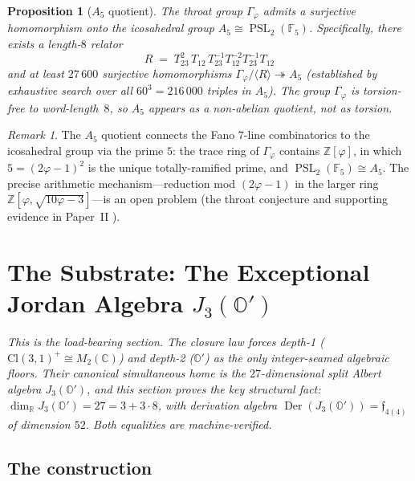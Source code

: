 \documentclass[11pt,a4paper]{article}
\theoremstyle{plain}
\newtheorem{proposition}[theorem]{Proposition}
\theoremstyle{definition}
\theoremstyle{remark}
\newtheorem{remark}[theorem]{Remark}
\numberwithin{equation}{section}
\providecommand{\Cl}{\mathrm{Cl}}
\providecommand{\R}{\mathbb{R}}
\providecommand{\C}{\mathbb{C}}
\providecommand{\Z}{\mathbb{Z}}
\providecommand{\F}{\mathbb{F}}
\providecommand{\Os}{\mathbb{O}'}
\providecommand{\vp}{\varphi}
\providecommand{\fk}[1]{\mathfrak{#1}}
\DeclareMathOperator{\Der}{Der}
\providecommand{\PSL}{\operatorname{PSL}}
\newenvironment{sectionopener}
  {\begin{sectionopenerframe}\small\itshape\ignorespaces}
  {\end{sectionopenerframe}}
\begin{document}
\begin{proposition}[$A_5$ quotient]
\label{prop:a5-quotient}
The throat group $\Gamma_\vp$ admits a surjective homomorphism
onto the icosahedral group $A_5 \cong \PSL_2(\F_5)$.
Specifically, there exists a length-$8$ relator
\[
  R \;=\; T_{23}^2 \, T_{12} \, T_{23}^{-1} T_{12}^{-2} T_{23}^{-1} T_{12}
\]
and at least $27\,600$ surjective homomorphisms
$\Gamma_\vp/\langle R\rangle \twoheadrightarrow A_5$
(established by exhaustive search over all $60^3 = 216\,000$
triples in $A_5$).  The group $\Gamma_\vp$ is torsion-free to
word-length~$8$, so $A_5$ appears as a non-abelian quotient, not
as torsion.
\end{proposition}

\begin{remark}
The $A_5$ quotient connects the Fano $7$-line combinatorics to the
icosahedral group via the prime $5$: the trace ring of $\Gamma_\vp$
contains $\Z[\vp]$, in which $5 = (2\vp-1)^2$ is the unique
totally-ramified prime, and $\PSL_2(\F_5) \cong A_5$.
The precise arithmetic mechanism---reduction mod $(2\vp-1)$ in
the larger ring $\Z[\vp, \sqrt{10\vp-3}]$---is an open problem
(the throat conjecture and supporting evidence in
Paper~II \cite{echo-rh}).
\end{remark}

\section{The Substrate: The Exceptional Jordan Algebra \texorpdfstring{$J_3(\Os)$}{J3(O')}}
\label{sec:albert}

\begin{sectionopener}
This is the load-bearing section.  The closure law forces depth-1
($\Cl(3,1)^+ \cong M_2(\C)$) and depth-2 ($\Os$) as the only
integer-seamed algebraic floors.  Their canonical simultaneous
home is the $27$-dimensional split Albert algebra $J_3(\Os)$, and
this section proves the key structural fact: $\dim_\R J_3(\Os) =
27 = 3 + 3\cdot 8$, with derivation algebra $\Der(J_3(\Os)) =
\fk{f}_{4(4)}$ of dimension $52$.  Both equalities are
machine-verified.
\end{sectionopener}

\subsection{The construction}
\end{document}
